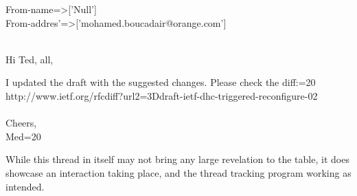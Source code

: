\documentclass[a4paper,english]{report}
\begin{document}
\begin{displayquote}
From-name=>['Null']\\
From-addres'=>['mohamed.boucadair@orange.com']\\\


Hi Ted, all,

I updated the draft with the suggested changes. Please check the diff:=20\\

http://www.ietf.org/rfcdiff?url2=3Ddraft-ietf-dhc-triggered-reconfigure-02\\\\

Cheers,\\
Med=20


\end{displayquote}


While this thread in itself may not bring any large revelation to the table, it does showcase an interaction taking place, and the thread tracking program working as intended.\\
\end{document}
